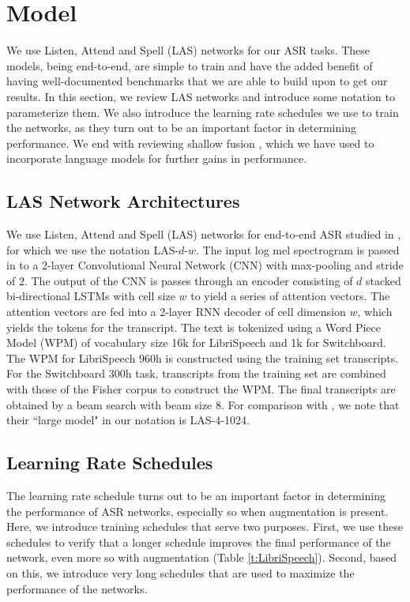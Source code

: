 \section{Model}

We use Listen, Attend and Spell (LAS) networks \cite{Chan2016ListenAA} for our ASR tasks. These models, being end-to-end, are simple to train and have the added benefit of having well-documented benchmarks \cite{zeyer-interspeech-2018, irie-arxiv-2019} that we are able to build upon to get our results. In this section, we review LAS networks and introduce some notation to parameterize them. We also introduce the learning rate schedules we use to train the networks, as they turn out to be an important factor in determining performance. We end with reviewing shallow fusion \cite{gulcehre-2015-arxiv}, which we have used to incorporate language models for further gains in performance.

\subsection{LAS Network Architectures}

We use Listen, Attend and Spell (LAS) networks \cite{Chan2016ListenAA} for end-to-end ASR studied in \cite{irie-arxiv-2019}, for which we use the notation LAS-$d$-$w$. The input log mel spectrogram is passed in to a 2-layer Convolutional Neural Network (CNN) with max-pooling and stride of $2$. The output of the CNN is passes through an encoder consisting of $d$ stacked bi-directional LSTMs with cell size $w$ to yield a series of attention vectors. The attention vectors are fed into a 2-layer RNN decoder of cell dimension $w$, which yields the tokens for the transcript. The text is tokenized using a Word Piece Model (WPM) \cite{schuster-icassp-2012} of vocabulary size 16k for LibriSpeech and 1k for Switchboard. The WPM for LibriSpeech 960h is constructed using the training set transcripts. For the Switchboard 300h task, transcripts from the training set are combined with those of the Fisher corpus to construct the WPM. The final transcripts are obtained by a beam search with beam size 8. For comparison with \cite{irie-arxiv-2019}, we note that their ``large model" in our notation is LAS-4-1024.

\subsection{Learning Rate Schedules}

The learning rate schedule turns out to be an important factor in determining the performance of ASR networks, especially so when augmentation is present. Here, we introduce training schedules that serve two purposes. First, we use these schedules to verify that a longer schedule improves the final performance of the network, even more so with augmentation (Table \ref{t:LibriSpeech}). Second, based on this, we introduce very long schedules that are used to maximize the performance of the networks.

